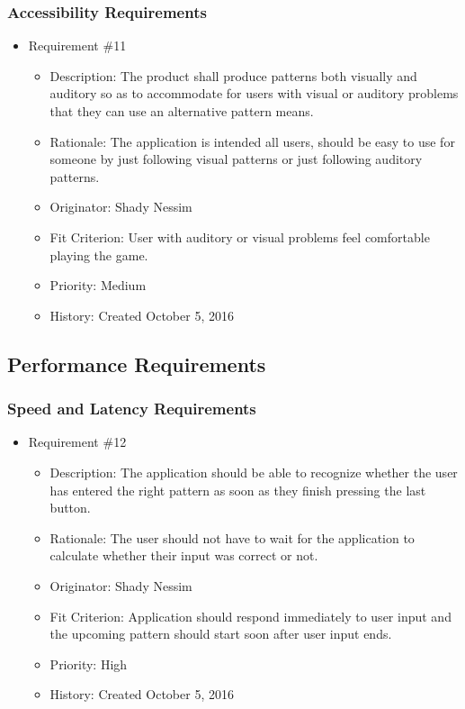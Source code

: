 \documentclass[12pt, titlepage]{article}
\begin{document}
\subsubsection{Accessibility Requirements}
\begin{itemize} 

\item Requirement \#11
\begin{itemize} 
\item Description: The product shall produce patterns both visually and auditory so as to accommodate for users with visual or auditory problems that they can use an alternative pattern means.
\item Rationale: The application is intended all users, should be easy to use for someone by just following visual patterns or just following auditory patterns.
\item Originator: Shady Nessim 
\item Fit Criterion: User with auditory or visual problems feel comfortable playing the game. 
\item Priority: Medium 
\item History: Created October 5, 2016
\end{itemize}

\end{itemize}

\subsection{Performance Requirements}
\subsubsection{Speed and Latency Requirements}
\begin{itemize}

\item Requirement \#12 
\begin{itemize} 
\item Description: The application should be able to recognize whether the user has entered the right pattern as soon as they finish pressing the last button.
\item Rationale: The user should not have to wait for the application to calculate whether their input was correct or not.
\item Originator: Shady Nessim 
\item Fit Criterion: Application should respond immediately to user input and the upcoming pattern should start soon after user input ends.
\item Priority: High 
\item History: Created October 5, 2016
\end{itemize}

\end{itemize}
\end{document}
